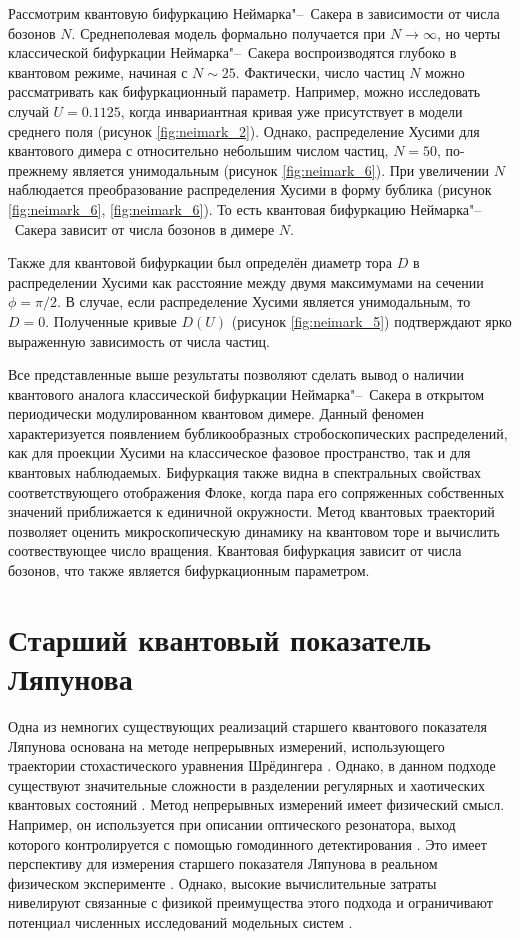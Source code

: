 Рассмотрим квантовую бифуркацию Неймарка"--~Сакера в зависимости от числа бозонов $N$.
Среднеполевая модель формально получается при $N \to \infty$, но черты классической бифуркации Неймарка"--~Сакера воспроизводятся глубоко в квантовом режиме, начиная с $N \sim 25$.
Фактически, число частиц $N$ можно рассматривать как бифуркационный параметр.
Например, можно исследовать случай $U=0.1125$, когда инвариантная кривая уже присутствует в модели среднего поля (рисунок \cref{fig:neimark_2}). 
Однако, распределение Хусими для квантового димера с относительно небольшим числом частиц, $N=50 $, по-прежнему является унимодальным (рисунок \cref{fig:neimark_6}).
При увеличении $N$ наблюдается преобразование распределения Хусими в форму бублика (рисунок \cref{fig:neimark_6}, \cref{fig:neimark_6}).
То есть квантовая бифуркацию Неймарка"--~Сакера зависит от числа бозонов в димере $N$.

Также для квантовой бифуркации был определён диаметр тора $D$ в распределении Хусими как расстояние между двумя максимумами на сечении $\phi = \pi / 2$.
В случае, если распределение Хусими является унимодальным, то $D = 0$. 
Полученные кривые $D(U)$ (рисунок \cref{fig:neimark_5}) подтверждают ярко выраженную зависимость от числа частиц.

Все представленные выше результаты позволяют сделать вывод о наличии квантового аналога классической бифуркации Неймарка"--~Сакера в открытом периодически модулированном квантовом димере.
Данный феномен характеризуется появлением бубликообразных стробоскопических распределений, как для проекции Хусими на классическое фазовое пространство, так и для квантовых наблюдаемых.
Бифуркация также видна в спектральных свойствах соответствующего отображения Флоке, когда пара его сопряженных собственных значений приближается к единичной окружности.
Метод квантовых траекторий позволяет оценить микроскопическую динамику на квантовом торе и вычислить соотвествующее число вращения.
Квантовая бифуркация зависит от числа бозонов, что также является бифуркационным параметром.

\section{Старший квантовый показатель Ляпунова}\label{sec:ch3/le}

Одна из немногих существующих реализаций старшего квантового показателя Ляпунова основана на методе непрерывных измерений, использующего траектории стохастического уравнения Шрёдингера \cite{Gisin1992}. 
Однако, в данном подходе существуют значительные сложности в разделении регулярных и хаотических квантовых состояний \cite{Ota2005, Kapulkin2008}. 
Метод непрерывных измерений имеет физический смысл.
Например, он используется при описании оптического резонатора, выход которого контролируется с помощью гомодинного детектирования \cite{Carmichael1993,Wiseman1993}. 
Это имеет перспективу для измерения старшего показателя Ляпунова в реальном физическом эксперименте \cite{Eastman2017}. 
Однако, высокие вычислительные затраты нивелируют связанные с физикой преимущества этого подхода и ограничивают потенциал численных исследований модельных систем \cite{Pokharel2018}.

